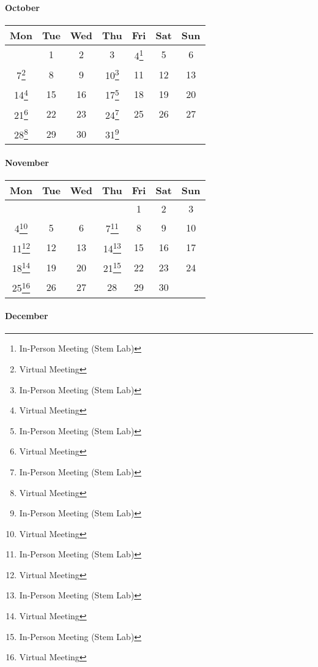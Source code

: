 \hypertarget{october}{%
\paragraph{October}\label{october}}

\begin{longtable}[]{@{}ccccccc@{}}
\toprule\noalign{}
Mon & Tue & Wed & Thu & Fri & Sat & Sun \\
\midrule\noalign{}
\endhead
\bottomrule\noalign{}
\endlastfoot
& 1 & 2 & 3 & 4\footnote{In-Person Meeting (Stem Lab)} & 5 & 6 \\
7\footnote{Virtual Meeting} & 8 & 9 & 10\footnote{In-Person Meeting
  (Stem Lab)} & 11 & 12 & 13 \\
14\footnote{Virtual Meeting} & 15 & 16 & 17\footnote{In-Person Meeting
  (Stem Lab)} & 18 & 19 & 20 \\
21\footnote{Virtual Meeting} & 22 & 23 & 24\footnote{In-Person Meeting
  (Stem Lab)} & 25 & 26 & 27 \\
28\footnote{Virtual Meeting} & 29 & 30 & 31\footnote{In-Person Meeting
  (Stem Lab)} & & & \\
\end{longtable}

\hypertarget{november}{%
\paragraph{November}\label{november}}

\begin{longtable}[]{@{}ccccccc@{}}
\toprule\noalign{}
Mon & Tue & Wed & Thu & Fri & Sat & Sun \\
\midrule\noalign{}
\endhead
\bottomrule\noalign{}
\endlastfoot
& & & & 1 & 2 & 3 \\
4\footnote{Virtual Meeting} & 5 & 6 & 7\footnote{In-Person Meeting (Stem
  Lab)} & 8 & 9 & 10 \\
11\footnote{Virtual Meeting} & 12 & 13 & 14\footnote{In-Person Meeting
  (Stem Lab)} & 15 & 16 & 17 \\
18\footnote{Virtual Meeting} & 19 & 20 & 21\footnote{In-Person Meeting
  (Stem Lab)} & 22 & 23 & 24 \\
25\footnote{Virtual Meeting} & 26 & 27 & 28 & 29 & 30 & \\
\end{longtable}

\hypertarget{december}{%
\paragraph{December}\label{december}}

